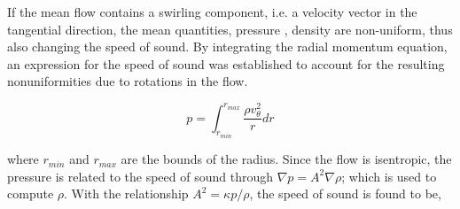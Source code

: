 



If the mean flow contains a swirling component, i.e. a velocity vector in the 
tangential direction, the mean quantities, pressure , density are non-uniform, 
thus also changing the speed of sound. By integrating the radial momentum
equation, an expression for the speed of sound was established to account for 
the resulting nonuniformities due to rotations in the flow. 




\begin{equation}
    p = \int_{r_{min}}^{r_{max}} \frac{\rho v_{\theta}^2}{r} dr 
    \label{eqn:radialmomentum_integrated}
\end{equation}

where $r_{min}$ and $r_{max}$ are the bounds of the radius. Since the flow
is isentropic, the pressure is related to the speed of sound through $\nabla p =
A^2 \nabla \rho$; which is used to compute $\rho$. With the relationship 
$A^2 = \kappa p/\rho$, the speed of sound is found to be,





